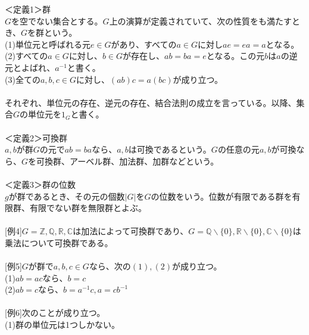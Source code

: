 \documentclass{jsarticle}
\title{}
\author{}
\date{}
\begin{document}
\maketitle

\noindent
＜定義1＞群\\
\(G\)を空でない集合とする。\(G\)上の演算が定義されていて、次の性質をも満たすとき、\(G\)を群という。\\
(1)単位元と呼ばれる元\(e\in G\)があり、すべての\(a\in G\)に対し\(ae=ea=a\)となる。\\
(2)すべての\(a\in G\)に対し、\(b\in G\)が存在し、\(ab=ba=e\)となる。この元\(b\)は\(a\)の逆元とよばれ、\(a^{-1}\)と書く。\\
(3)全ての\(a,b,c\in G\)に対し、\((ab)c=a(bc)\)が成り立つ。\\
\\
それぞれ、単位元の存在、逆元の存在、結合法則の成立を言っている。以降、集合\(G\)の単位元を\(1_{G}\)と書く。\\
\\
＜定義2＞可換群\\
\(a,b\)が群\(G\)の元で\(ab=ba\)なら、\(a,b\)は可換であるという。\(G\)の任意の元\(a,b\)が可換なら、\(G\)を可換群、アーベル群、加法群、加群などという。\\
\\
＜定義3＞群の位数\\
\(g\)が群であるとき、その元の個数\(|G|\)を\(G\)の位数をいう。位数が有限である群を有限群、有限でない群を無限群とよぶ。\\
\\
\hspace{5mm}[例4]\(G=\mathbb{Z},\mathbb{Q},\mathbb{R},\mathbb{C}\)は加法によって可換群であり、\(G=\mathbb{Q}\backslash\{0\},\mathbb{R}\backslash\{0\},\mathbb{C}\backslash\{0\}\)は乗法について可換群である。\\
\\
\hspace{5mm}[例5]\(G\)が群で\(a,b,c\in G\)なら、次の\((1),(2)\)が成り立つ。\\
\hspace{5mm}(1)\(ab=ac\)なら、\(b=c\)\\
\hspace{5mm}(2)\(ab=c\)なら、\(b=a^{-1}c,a=cb^{-1}\)\\
\\
\hspace{5mm}[例6]次のことが成り立つ。\\
\hspace{5mm}(1)群の単位元は1つしかない。\\
\end{document}
